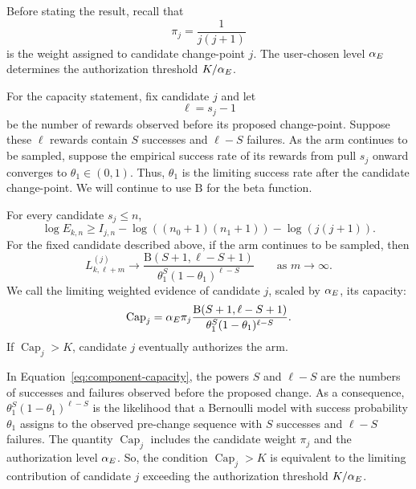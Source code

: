 Before stating the result, recall that
\[
\pi_j=\frac{1}{j(j+1)}
\]
is the weight assigned to candidate change-point $j$.
The user-chosen level $\alpha_E$ determines the authorization threshold $K/\alpha_E$.

For the capacity statement, fix candidate $j$ and let
\[
\ell=s_j-1
\]
be the number of rewards observed before its proposed change-point.
Suppose these $\ell$ rewards contain $S$ successes and $\ell-S$ failures.
As the arm continues to be sampled, suppose the empirical success rate of its
rewards from pull $s_j$ onward converges to $\theta_1\in(0,1)$.
Thus, $\theta_1$ is the limiting success rate after the candidate change-point.
We will continue to use $\mathrm{B}$ for the beta function.

\begin{theorem}
\label{thm:evidence-budget}
For every candidate $s_j\leq n$,
\begin{equation}
 \log E_{k,n}
 \geq
 I_{j,n}
 -\log((n_0+1)(n_1+1))
 -\log(j(j+1)).
 \label{eq:information-budget}
\end{equation}
For the fixed candidate described above, if the arm continues to be sampled,
then
\begin{equation}
 L_{k,\ell+m}^{(j)}
 \longrightarrow
 \frac{\mathrm{B}(S+1,\ell-S+1)}
 {\theta_1^S(1-\theta_1)^{\ell-S}}
 \qquad\text{as }m\to\infty.
 \label{eq:component-capacity}
\end{equation}
We call the limiting weighted evidence of candidate $j$, scaled by
$\alpha_E$, its capacity:
\[
 \operatorname{Cap}_j
 =
 \alpha_E\pi_j
 \frac{\mathrm{B}(S+1,\ell-S+1)}
 {\theta_1^S(1-\theta_1)^{\ell-S}}.
\]
If $\operatorname{Cap}_j>K$, candidate $j$ eventually authorizes the arm.
\end{theorem}

In Equation~\eqref{eq:component-capacity}, the powers $S$ and $\ell-S$ are the
numbers of successes and failures observed before the proposed change.
As a consequence,
$\theta_1^S(1-\theta_1)^{\ell-S}$ is the likelihood that a Bernoulli model with success
probability $\theta_1$ assigns to the observed pre-change sequence with $S$ successes and $\ell-S$ failures.
The quantity $\operatorname{Cap}_j$ includes the candidate weight
$\pi_j$ and the authorization level $\alpha_E$.
So, the condition $\operatorname{Cap}_j>K$ is equivalent to the limiting contribution of
candidate $j$ exceeding the authorization threshold $K/\alpha_E$.

